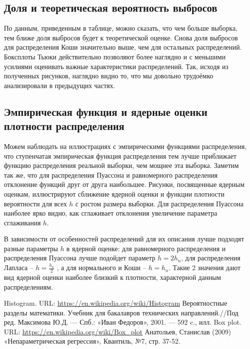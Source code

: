 \documentclass[12pt]{article}
\begin{document}
\subsection{Доля и теоретическая вероятность выбросов}
По данным, приведенным в таблице, можно сказать, что чем больше выборка,
тем ближе доля выбросов будет к теоретической оценке. Снова доля выбросов для
распределения Коши значительно выше, чем для остальных распределений. 
Боксплоты Тьюки действительно позволяют более наглядно и с меньшими 
усилиями оценивать важные характеристики распределений. 
Так, исходя из полученных рисунков, наглядно видно то, 
что мы довольно трудоёмко анализировали в предыдущих частях.

\subsection{Эмпирическая функция и ядерные оценки плотности распределения}
Можем наблюдать на иллюстрациях с эмпирическими функциями распределения, 
что ступенчатая эмпирическая функция распределения тем лучше приближает 
функцию распределения реальной выборки, чем мощнее эта выборка. 
Заметим так же, что для распределения Пуассона и равномерного распределения 
отклонение функций  друг от друга наибольшее.
Рисунки, посвященные ядерным оценкам, иллюстрируют сближение ядерной оценки и
функции плотности вероятности для всех $h$ с ростом размера выборки. 
Для распределения Пуассона наиболее ярко видно, как сглаживает отклонения увеличение
параметра сглаживания $h$.

В зависимости от особенностей распределений для их описания лучше подходят разные параметры
$h$ в ядерной оценке: для равномерного распределения и распределения Пуассона лучше подойдет 
параметр $h = 2h_n$, для распределения Лапласа – $h = \frac{h_n}{2}$ , а для нормального и Коши – $h = h_n$. Такие 2
значения дают вид ядерной оценки наиболее близкий к плотности, характерной данным распределениям.



\clearpage
{}


\begin{thebibliography}{4}
    Histogram. URL: \url{https://en.wikipedia.org/wiki/Histogram}
    Вероятностные разделы математики. Учебник для бакалавров технических направлений.//Под ред. Максимова Ю.Д. --- Спб.: «Иван Федоров», 2001. --- 592 c., илл.
    Box plot. URL: \url{https://en.wikipedia.org/wiki/Box_plot}
    Анатольев, Станислав (2009) «Непараметрическая регрессия», Квантиль, №7, стр. 37-52.
\end{thebibliography}
\end{document}
